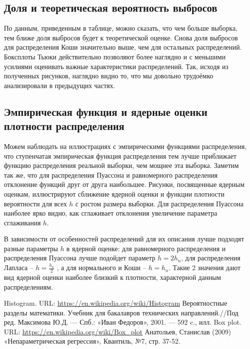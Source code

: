 \documentclass[12pt]{article}
\begin{document}
\subsection{Доля и теоретическая вероятность выбросов}
По данным, приведенным в таблице, можно сказать, что чем больше выборка,
тем ближе доля выбросов будет к теоретической оценке. Снова доля выбросов для
распределения Коши значительно выше, чем для остальных распределений. 
Боксплоты Тьюки действительно позволяют более наглядно и с меньшими 
усилиями оценивать важные характеристики распределений. 
Так, исходя из полученных рисунков, наглядно видно то, 
что мы довольно трудоёмко анализировали в предыдущих частях.

\subsection{Эмпирическая функция и ядерные оценки плотности распределения}
Можем наблюдать на иллюстрациях с эмпирическими функциями распределения, 
что ступенчатая эмпирическая функция распределения тем лучше приближает 
функцию распределения реальной выборки, чем мощнее эта выборка. 
Заметим так же, что для распределения Пуассона и равномерного распределения 
отклонение функций  друг от друга наибольшее.
Рисунки, посвященные ядерным оценкам, иллюстрируют сближение ядерной оценки и
функции плотности вероятности для всех $h$ с ростом размера выборки. 
Для распределения Пуассона наиболее ярко видно, как сглаживает отклонения увеличение
параметра сглаживания $h$.

В зависимости от особенностей распределений для их описания лучше подходят разные параметры
$h$ в ядерной оценке: для равномерного распределения и распределения Пуассона лучше подойдет 
параметр $h = 2h_n$, для распределения Лапласа – $h = \frac{h_n}{2}$ , а для нормального и Коши – $h = h_n$. Такие 2
значения дают вид ядерной оценки наиболее близкий к плотности, характерной данным распределениям.



\clearpage
{}


\begin{thebibliography}{4}
    Histogram. URL: \url{https://en.wikipedia.org/wiki/Histogram}
    Вероятностные разделы математики. Учебник для бакалавров технических направлений.//Под ред. Максимова Ю.Д. --- Спб.: «Иван Федоров», 2001. --- 592 c., илл.
    Box plot. URL: \url{https://en.wikipedia.org/wiki/Box_plot}
    Анатольев, Станислав (2009) «Непараметрическая регрессия», Квантиль, №7, стр. 37-52.
\end{thebibliography}
\end{document}
